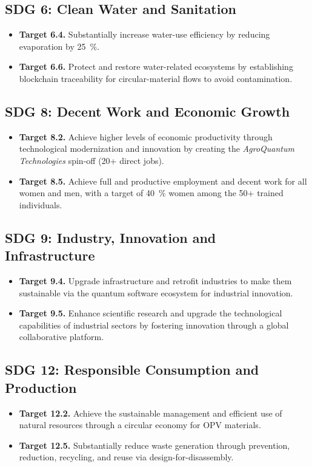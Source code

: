 \documentclass[12pt, a4paper]{article}
\begin{document}
\subsection{SDG 6: Clean Water and Sanitation}
\begin{itemize}
    \item \textbf{Target 6.4.} Substantially increase water-use efficiency by reducing evaporation by \SI{25}{\percent}.

    \item \textbf{Target 6.6.} Protect and restore water-related ecosystems by establishing blockchain traceability for circular-material flows to avoid contamination.
\end{itemize}

\subsection{SDG 8: Decent Work and Economic Growth}
\begin{itemize}
    \item \textbf{Target 8.2.} Achieve higher levels of economic productivity through technological modernization and innovation by creating the \textit{AgroQuantum Technologies} spin-off (\num{20}+ direct jobs).

    \item \textbf{Target 8.5.} Achieve full and productive employment and decent work for all women and men, with a target of \SI{40}{\percent} women among the \num{50}+ trained individuals.
\end{itemize}

\subsection{SDG 9: Industry, Innovation and Infrastructure}
\begin{itemize}
    \item \textbf{Target 9.4.} Upgrade infrastructure and retrofit industries to make them sustainable via the quantum software ecosystem for industrial innovation.

    \item \textbf{Target 9.5.} Enhance scientific research and upgrade the technological capabilities of industrial sectors by fostering innovation through a global collaborative platform.
\end{itemize}

\subsection{SDG 12: Responsible Consumption and Production}
\begin{itemize}
    \item \textbf{Target 12.2.} Achieve the sustainable management and efficient use of natural resources through a circular economy for OPV materials.

    \item \textbf{Target 12.5.} Substantially reduce waste generation through prevention, reduction, recycling, and reuse via design-for-disassembly.
\end{itemize}
\end{document}
